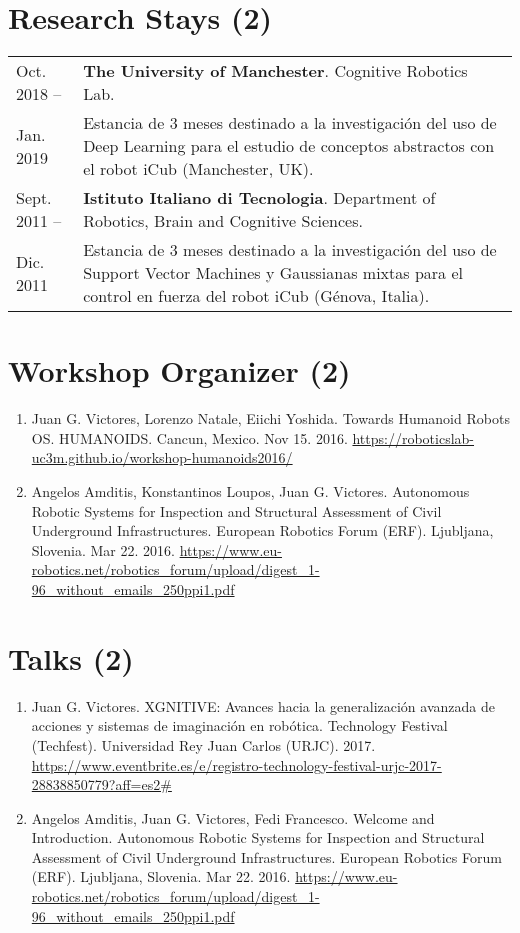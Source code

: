 \documentclass{article}
\begin{document}
\section*{Research Stays (2)}
\begin{tabular}{l p{14cm}}
Oct. 2018 --&{\bf The University of Manchester}. Cognitive Robotics Lab.\\
Jan. 2019&Estancia de 3 meses destinado a la investigación del uso de Deep Learning para el estudio de conceptos abstractos con el robot iCub (Manchester, UK).\\
\rule{0pt}{4ex}
Sept. 2011 --&{\bf Istituto Italiano di Tecnologia}. Department of Robotics, Brain and Cognitive Sciences.\\
Dic. 2011&Estancia de 3 meses destinado a la investigación del uso de Support Vector Machines y Gaussianas mixtas para el control en fuerza del robot iCub (Génova, Italia).
\end{tabular}

\section*{Workshop Organizer (2)}
\begin{enumerate}
\item Juan G. Victores, Lorenzo Natale, Eiichi Yoshida. Towards Humanoid Robots OS. HUMANOIDS. Cancun, Mexico. Nov 15. 2016. \url{https://roboticslab-uc3m.github.io/workshop-humanoids2016/}
\item Angelos Amditis, Konstantinos Loupos, Juan G. Victores. Autonomous Robotic Systems for Inspection and Structural Assessment of Civil Underground Infrastructures. European Robotics Forum (ERF). Ljubljana, Slovenia. Mar 22. 2016. \url{https://www.eu-robotics.net/robotics\_forum/upload/digest\_1-96\_without\_emails\_250ppi1.pdf}
\end{enumerate}

\section*{Talks (2)}
\begin{enumerate}
\item Juan G. Victores. XGNITIVE: Avances hacia la generalización avanzada de acciones y sistemas de imaginación en robótica. Technology Festival (Techfest). Universidad Rey Juan Carlos (URJC). 2017. \url{https://www.eventbrite.es/e/registro-technology-festival-urjc-2017-28838850779?aff=es2#}
\item Angelos Amditis, Juan G. Victores, Fedi Francesco. Welcome and Introduction. Autonomous Robotic Systems for Inspection and Structural Assessment of Civil Underground Infrastructures. European Robotics Forum (ERF). Ljubljana, Slovenia. Mar 22. 2016. \url{https://www.eu-robotics.net/robotics\_forum/upload/digest\_1-96\_without\_emails\_250ppi1.pdf}
\end{enumerate}
\end{document}

